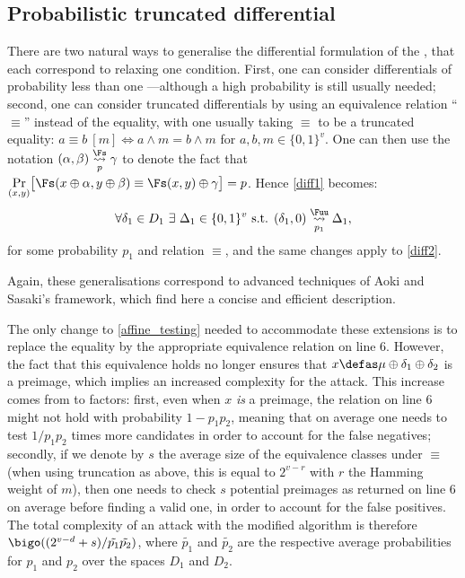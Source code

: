 \subsection{Probabilistic truncated differential \mitm}
\label{probtrunc}

There are two natural ways to generalise the differential formulation of the \mitm, that each correspond to relaxing one condition.
First, one can consider differentials of probability less than one ---although a high probability is still usually needed;
second, one can consider truncated differentials by using an
equivalence relation ``$\equiv$'' instead of the equality, with one usually taking $\equiv$ to be a truncated equality:
$a \equiv b~[m] \Leftrightarrow a \wedge m = b \wedge m$ for $a, b, m
\in \{0,1\}^v$.
One can then use the notation
$(\alpha,  \beta) \overset{\Fs}{\underset{p}{\rightsquigarrow}} \gamma$ to denote the fact that 
$\underset{(x,y)}{\Pr}\big[\Fs(x \oplus \alpha, y \oplus \beta) \equiv \Fs(x, y) \oplus \gamma\big] = p$. Hence \autoref{diff1} becomes:
\begin{equation}
\forall \delta_1 \in D_1~\exists~ \Delta_1 \in \{0,1\}^v \text{ s.t. } (\delta_1, 0) \overset{\Fuu}{\underset{p_1}{\rightsquigarrow}} \Delta_1,
\end{equation}
for some probability $p_1$ and relation $\equiv$, and the same changes apply to \autoref{diff2}.

Again, these generalisations correspond to advanced techniques of Aoki and Sasaki's framework, which find here a concise and efficient description.

\medskip

The only change to \autoref{affine_testing} needed to accommodate these extensions is to replace the equality by the appropriate equivalence
relation on line 6. However, the fact that this equivalence holds no longer ensures that $x \defas \mu \oplus \delta_1 \oplus \delta_2$ is a preimage,
which implies an increased complexity for the attack.
This increase comes from to factors:  first, even when $x$ \emph{is} a preimage, the relation on line 6 might not
hold with probability $1 - p_1p_2$, meaning that on average one needs to test $1/p_1p_2$ times more candidates in order to account for
the false negatives; secondly, if we denote by $s$ the average size of the equivalence classes under $\equiv$ (when using truncation as
above, this is equal to $2^{v - r}$ with $r$ the Hamming weight of $m$), then one needs to check $s$ potential preimages
as returned on line 6 on average before finding a valid one, in order to account for the false positives.
The total complexity of an attack with the modified algorithm is therefore $\bigo((2^{v-d} + s)/\tilde{p_1}\tilde{p_2})$, where $\tilde{p_1}$ and $\tilde{p_2}$ are the respective
average probabilities for $p_1$ and $p_2$ over the spaces $D_1$ and $D_2$.

